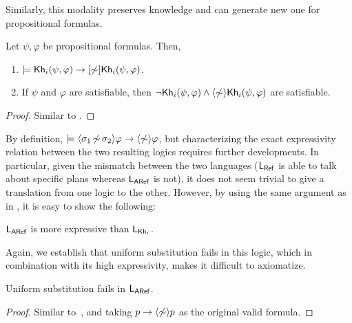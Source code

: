 Similarly, this modality preserves knowledge and can generate new one for propositional formulas.

\medskip

\begin{proposition}\label{prop:aref-preserves-gains}
Let $\psi,\varphi$ be propositional formulas. Then, 
\begin{enumerate}
\item\label{itm:aref:preservesknowledge} $\models {\sf Kh}_i(\psi,\varphi) \rightarrow [\not\sim]{\sf Kh}_i(\psi,\varphi)$.
\item\label{itm:aref:gainsknowledge} If $\psi$ and $\varphi$ are satisfiable, then $\neg{\sf Kh}_i(\psi,\varphi) \wedge \langle \not\sim \rangle{\sf Kh}_i(\psi,\varphi)$ are satisfiable.
\end{enumerate}
\end{proposition}
\begin{proof}
Similar to .
\end{proof}

By definition, $\models \langle \sigma_1{\,\not\sim\,}\sigma_2 \rangle\varphi \rightarrow \langle \not\sim \rangle\varphi$, but characterizing the exact expressivity relation between the two resulting logics requires further developments.
In particular, given the mismatch between the two languages ($\mathsf{L_{Ref}}$ is able to talk about specific plans whereas $\mathsf{L_{ARef}}$ is not), it does not seem trivial to give a translation from one logic to the other.
However, by using the same argument as in , it is easy to show the following:

\medskip

\begin{proposition}\label{prop:exparef}
$\mathsf{L_{ARef}}$ is more expressive than $\mathsf{L}_{{\sf Kh}_i}$.
\end{proposition}

\medskip

Again, we establish that uniform substitution fails in this logic, which in combination with its high expressivity, makes it difficult to axiomatize.

\medskip

\begin{proposition}\label{prop:substitution-aref}
    Uniform substitution fails in $\mathsf{L_{ARef}}$.
\end{proposition}

\begin{proof}
Similar to~, and taking $p\to\langle \not\sim \rangle p$ as the original valid formula.
\end{proof}

